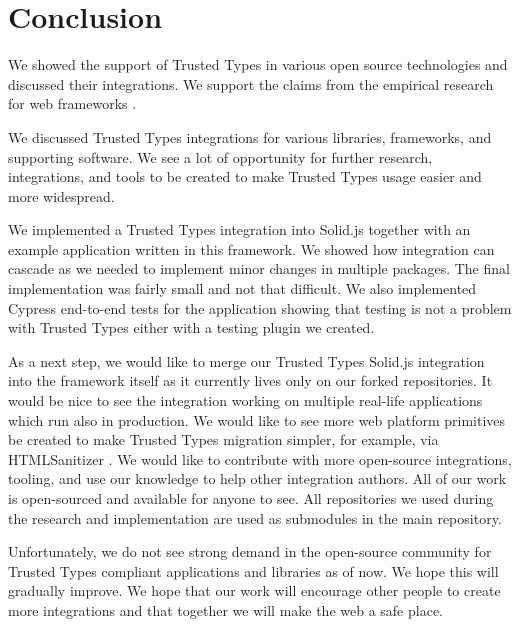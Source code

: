 \chapter{Conclusion}


We showed the support of Trusted Types in various open source technologies and discussed their
integrations. We support the claims from the empirical research for web frameworks
\cite{tt_web_framework_paper}.

We discussed Trusted Types integrations for various libraries, frameworks, and supporting software.
We see a lot of opportunity for further research, integrations, and tools to be created to make
Trusted Types usage easier and more widespread.

We implemented a Trusted Types integration into Solid.js together with an example application
written in this framework. We showed how integration can cascade as we needed to implement minor
changes in multiple packages. The final implementation was fairly small and not that difficult. We
also implemented Cypress end-to-end tests for the application showing that testing is not a problem
with Trusted Types either with a testing plugin we created.

As a next step, we would like to merge our Trusted Types Solid.js integration into the framework
itself as it currently lives only on our forked repositories. It would be nice to see the
integration working on multiple real-life applications which run also in production. We would like
to see more web platform primitives be created to make Trusted Types migration simpler, for example,
via HTMLSanitizer \cite{tt_report_mid2021}. We would like to contribute with more open-source
integrations, tooling, and use our knowledge to help other integration authors. All of our work is
open-sourced and available for anyone to see. All repositories we used during the research and
implementation are used as submodules in the main repository.

Unfortunately, we do not see strong demand in the open-source community for Trusted Types
compliant applications and libraries as of now. We hope this will gra\-dually improve. We hope that
our work will encourage other people to create more integrations and that together we will make the
web a safe place.
